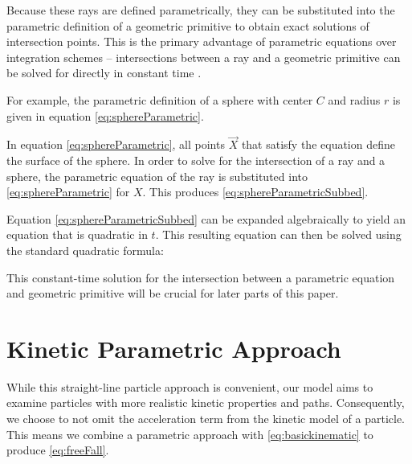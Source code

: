 Because these rays are defined parametrically, they can be substituted into the parametric definition of a geometric primitive to obtain exact solutions of intersection points. This is the primary advantage of parametric equations over integration schemes -- intersections between a ray and a geometric primitive can be solved for directly in constant time \cite{glassner1989introduction}.

For example, the parametric definition of a sphere with center $C$ and radius $r$ is given in equation \eqref{eq:sphereParametric}.

 {
	\label{eq:sphereParametric}
}

In equation \eqref{eq:sphereParametric}, all points $\vec{X}$ that satisfy the equation define the surface of the sphere. In order to solve for the intersection of a ray and a sphere, the parametric equation of the ray is substituted into \eqref{eq:sphereParametric} for $X$. This produces \eqref{eq:sphereParametricSubbed}.

 {
	\label{eq:sphereParametricSubbed}
}


Equation \eqref{eq:sphereParametricSubbed} can be expanded algebraically to yield an equation that is quadratic in $t$. This resulting equation can then be solved using the standard quadratic formula:

 {
	\label{eq:quadratic}
}

This constant-time solution for the intersection between a parametric equation and geometric primitive will be crucial for later parts of this paper.

\section{Kinetic Parametric Approach}

While this straight-line particle approach is convenient, our model aims to examine particles with more realistic kinetic properties and paths. Consequently, we choose to not omit the acceleration term from the kinetic model of a particle. This means we combine a parametric approach with \eqref{eq:basickinematic} to produce \eqref{eq:freeFall}.



